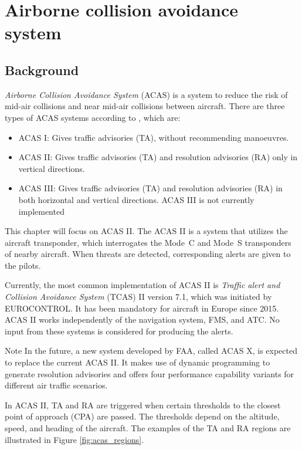 \chapter{Airborne collision avoidance system}

\section{Background}

\emph{Airborne Collision Avoidance System} (ACAS) is a system to reduce the risk of mid-air collisions and near mid-air collisions between aircraft. There are three types of ACAS systems according to \cite{icaoA10V4}, which are:

\begin{itemize}
  \item ACAS I: Gives traffic advisories (TA), without recommending manoeuvres.
  \item ACAS II: Gives traffic advisories (TA) and resolution advisories (RA) only in vertical directions.
  \item ACAS III: Gives traffic advisories (TA) and resolution advisories (RA) in both horizontal and vertical directions. ACAS III is not currently implemented
\end{itemize}

This chapter will focus on ACAS II. The ACAS II is a system that utilizes the aircraft transponder, which interrogates the Mode~C and Mode~S transponders of nearby aircraft. When threats are detected, corresponding alerts are given to the pilots.

Currently, the most common implementation of ACAS II is \emph{Traffic alert and Collision Avoidance System} (TCAS) II version 7.1, which was initiated by EUROCONTROL. It has been mandatory for aircraft in Europe since 2015. ACAS II works independently of the navigation system, FMS, and ATC. No input from these systems is considered for producing the alerts. 


\begin{notebox}{Note}
In the future, a new system developed by FAA, called ACAS X, is expected to replace the current ACAS II. It makes use of dynamic programming to generate resolution advisories and offers four performance capability variants for different air traffic scenarios. \cite{chomik2016}
\end{notebox}
  

In ACAS II, TA and RA are triggered when certain thresholds to the closest point of approach (CPA) are passed. The thresholds depend on the altitude, speed, and heading of the aircraft. The examples of the TA and RA regions are illustrated in Figure \ref{fig:acas_regions}.

